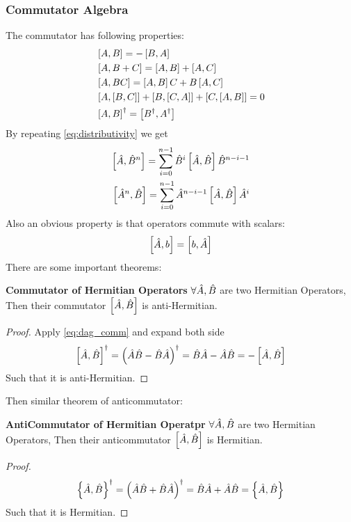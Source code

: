 \subsubsection{Commutator Algebra}
The commutator has following properties: 
\begin{align}
    &\left[ A , B \right] = - \left[ B , A \right] \\
    &\left[ A , B+C \right] = \left[ A , B \right] + \left[ A , C \right]\\
    &\left[ A , BC \right] = \left[ A , B \right] C + B\left[ A , C \right] \label{eq:distributivity}\\
    &\left[ A , \left[ B , C \right] \right] + \left[ B , \left[ C , A \right] \right] + \left[ C , \left[ A , B \right] \right] = 0 \\
    & \left[ A , B \right]^ \dag = \left[ B^ \dag , A^ \dag \right] \label{eq:dag_comm}
\end{align}
By repeating \cref{eq:distributivity} we get 
\begin{align}
    \left[ \hat{A} , \hat{B}^n \right] = \sum_{i=0}^{n-1} \hat{B}^i \left[ \hat{A} , \hat{B} \right] \hat{B}^{n-i-1} \label{eq:power_commu_2}\\
    \left[ \hat{A}^n , \hat{B} \right] = \sum_{i=0}^{n-1} \hat{A}^{n-i-1} \left[ \hat{A} , \hat{B} \right] \hat{A}^i \label{eq:power_commu_1}
\end{align}
Also an obvious property is that operators commute with scalars:
\begin{eqnarray}
    \left[ \hat{A} , b \right] = \left[ b , \hat{A} \right]
\end{eqnarray}
There are some important theorems: 
\begin{theorem}{\textbf{Commutator of Hermitian Operators}} \label{theorem:commutator_Hermitian}
    $\forall \hat{A}, \hat{B}$ are two Hermitian Operators, Then their commutator $\left[ \hat{A} , \hat{B} \right]$ is anti-Hermitian.
\end{theorem}
\begin{proof}
    Apply \cref{eq:dag_comm} and expand both side 
    \begin{eqnarray}
        \left[ \hat{A} , \hat{B} \right]^ \dag = \left(\hat{A} \hat{B} - \hat{B} \hat{A}\right)^ \dag = \hat{B} \hat{A} - \hat{A} \hat{B} = - \left[ \hat{A} , \hat{B} \right]
    \end{eqnarray}
    Such that it is anti-Hermitian.
\end{proof}
Then similar theorem of anticommutator:
\begin{theorem}{\textbf{AntiCommutator of Hermitian Operatpr}} \label{theorem:anticommutator_Hermitian}
    $\forall \hat{A}, \hat{B}$ are two Hermitian Operators, Then their anticommutator $\left[ \hat{A} , \hat{B} \right]$ is Hermitian.
\end{theorem}
\begin{proof}
    \begin{eqnarray}
        \left\{ \hat{A} , \hat{B} \right\}^ \dag = \left(\hat{A} \hat{B} + \hat{B} \hat{A}\right)^ \dag = \hat{B}\hat{A} + \hat{A}\hat{B} = \left\{ \hat{A} , \hat{B} \right\}
    \end{eqnarray}
    Such that it is Hermitian.
\end{proof}
